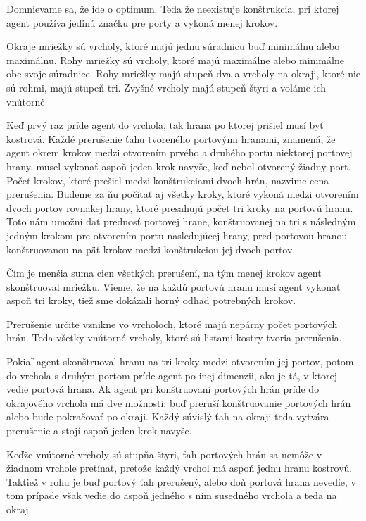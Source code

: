 Domnievame sa, že ide o optimum. Teda že neexistuje konštrukcia, pri ktorej
agent používa jedinú značku pre porty a vykoná menej krokov. 



\begin{ozn}
Okraje mriežky sú vrcholy, ktoré majú jednu súradnicu buď minimálnu alebo
maximálnu. Rohy mriežky sú vrcholy, ktoré majú maximálne alebo minimálne obe
svoje súradnice.
Rohy mriežky majú stupeň dva a vrcholy na okraji, ktoré nie sú rohmi, majú
stupeň tri.
Zvyšné vrcholy majú stupeň štyri a voláme ich vnútorné
\end{ozn}

Keď prvý raz príde agent do vrchola, tak hrana po ktorej prišiel musí byť
kostrová.
Každé prerušenie ťahu tvoreného portovými hranami, znamená, že agent okrem
krokov medzi otvorením prvého a druhého portu niektorej portovej hrany,
musel vykonať aspoň jeden krok navyše, keď nebol otvorený žiadny port. 
Počet krokov, ktoré prešiel medzi konštrukciami dvoch hrán, nazvime 
cena prerušenia. Budeme za ňu počítať aj všetky kroky, ktoré vykoná medzi
otvorením dvoch portov rovnakej hrany, ktoré presahujú počet tri kroky na
portovú hranu. Toto nám umožní dať prednosť portovej hrane, konštruovanej na
tri s následným jedným krokom pre otvorením portu nasledujúcej hrany, pred
portovou hranou konštruovanou na päť krokov medzi konštrukciou jej dvoch
portov.

Čím je menšia suma cien všetkých prerušení, na tým menej krokov agent
skonštruoval mriežku.
Vieme, že na každú portovú hranu musí agent vykonať aspoň tri kroky, tiež
sme dokázali horný odhad potrebných krokov.

Prerušenie určite vznikne vo vrcholoch, ktoré majú nepárny počet portových
hrán. Teda všetky vnútorné vrcholy, ktoré sú listami kostry tvoria
prerušenia.

Pokiaľ agent skonštruoval hranu na tri kroky medzi otvorením jej portov,
potom do vrchola s druhým portom príde agent po inej dimenzii, ako je tá,
v ktorej vedie portová hrana. Ak agent pri konštruovaní portových hrán príde
do okrajového vrchola má dve možnosti: buď preruší konštruovanie portových
hrán alebo bude pokračovať po okraji. Každý súvislý ťah na okraji teda
vytvára prerušenie a stojí aspoň jeden krok navyše.

Keďže vnútorné vrcholy sú stupňa štyri, ťah portových hrán sa nemôže v
žiadnom vrchole pretínať, pretože každý vrchol má aspoň jednu hranu kostrovú.
Taktiež v rohu je buď portový ťah prerušený, alebo doň portová hrana
nevedie, v tom prípade však vedie do aspoň jedného s ním susedného vrchola a
teda na okraj.

